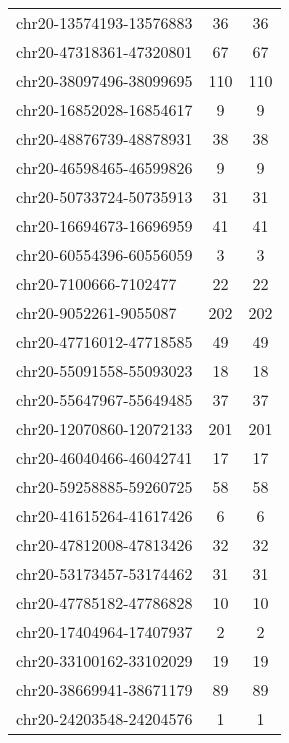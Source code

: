 \begin{longtable}{lSS}
	chr20-13574193-13576883 & 36     & 36                         \\
	chr20-47318361-47320801 & 67     & 67                         \\
	chr20-38097496-38099695 & 110    & 110                        \\
	chr20-16852028-16854617 & 9      & 9                          \\
	chr20-48876739-48878931 & 38     & 38                         \\
	chr20-46598465-46599826 & 9      & 9                          \\
	chr20-50733724-50735913 & 31     & 31                         \\
	chr20-16694673-16696959 & 41     & 41                         \\
	chr20-60554396-60556059 & 3      & 3                          \\
	chr20-7100666-7102477   & 22     & 22                         \\
	chr20-9052261-9055087   & 202    & 202                        \\
	chr20-47716012-47718585 & 49     & 49                         \\
	chr20-55091558-55093023 & 18     & 18                         \\
	chr20-55647967-55649485 & 37     & 37                         \\
	chr20-12070860-12072133 & 201    & 201                        \\
	chr20-46040466-46042741 & 17     & 17                         \\
	chr20-59258885-59260725 & 58     & 58                         \\
	chr20-41615264-41617426 & 6      & 6                          \\
	chr20-47812008-47813426 & 32     & 32                         \\
	chr20-53173457-53174462 & 31     & 31                         \\
	chr20-47785182-47786828 & 10     & 10                         \\
	chr20-17404964-17407937 & 2      & 2                          \\
	chr20-33100162-33102029 & 19     & 19                         \\
	chr20-38669941-38671179 & 89     & 89                         \\
	chr20-24203548-24204576 & 1      & 1                          \\

\end{longtable}
